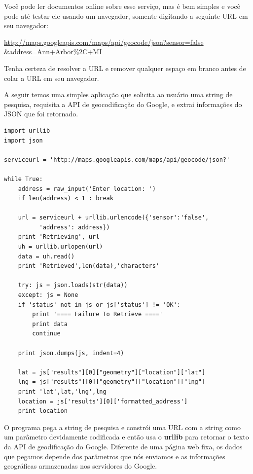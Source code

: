 Você pode ler documentos online sobre esse serviço, mas é bem simples e você
pode até testar ele usando um navegador, somente digitando a seguinte URL em
seu navegador:

\url{http://maps.googleapis.com/maps/api/geocode/json?sensor=false &address=Ann+Arbor%2C+MI}

Tenha certeza de resolver a URL e remover qualquer espaço em branco antes de 
colar a URL em seu navegador.

A seguir temos uma simples aplicação que solicita ao usuário uma string de
pesquisa, requisita a API de geocodificação do Google, e extrai informações do
JSON que foi retornado.

\beforeverb
\begin{verbatim}
import urllib
import json

serviceurl = 'http://maps.googleapis.com/maps/api/geocode/json?'

while True:
    address = raw_input('Enter location: ')
    if len(address) < 1 : break

    url = serviceurl + urllib.urlencode({'sensor':'false', 
          'address': address})
    print 'Retrieving', url
    uh = urllib.urlopen(url)
    data = uh.read()
    print 'Retrieved',len(data),'characters'

    try: js = json.loads(str(data))
    except: js = None
    if 'status' not in js or js['status'] != 'OK':
        print '==== Failure To Retrieve ===='
        print data
        continue

    print json.dumps(js, indent=4)

    lat = js["results"][0]["geometry"]["location"]["lat"]
    lng = js["results"][0]["geometry"]["location"]["lng"]
    print 'lat',lat,'lng',lng
    location = js['results'][0]['formatted_address']
    print location
\end{verbatim}
\afterverb
%
O programa pega a string de pesquisa e constrói uma URL com a string
como um parâmetro devidamente codificada e então usa o {\bf urllib}
para retornar o texto da API de geodificação do Google. Diferente
de uma página web fixa, os dados que pegamos depende dos parâmetros 
que nós enviamos e as informações geográficas armazenadas nos 
servidores do Google.


